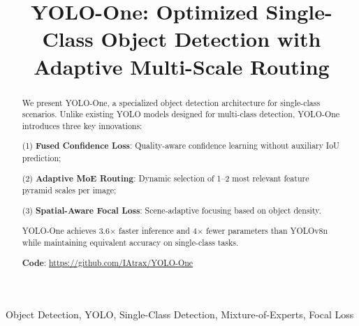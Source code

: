 \documentclass[conference]{IEEEtran}
\begin{document}

\title{YOLO-One: Optimized Single-Class Object Detection with Adaptive Multi-Scale Routing}

\author{
}


\maketitle


\begin{abstract}
We present YOLO-One, a specialized object detection architecture for single-class scenarios. Unlike existing YOLO models designed for multi-class detection, YOLO-One introduces three key innovations:

(1) \textbf{Fused Confidence Loss}: Quality-aware confidence learning without auxiliary IoU prediction;

(2) \textbf{Adaptive MoE Routing}: Dynamic selection of 1--2 most relevant feature pyramid scales per image;

(3) \textbf{Spatial-Aware Focal Loss}: Scene-adaptive focusing based on object density.

YOLO-One achieves 3.6$\times$ faster inference and 4$\times$ fewer parameters than YOLOv8n while maintaining equivalent accuracy on single-class tasks.

\textbf{Code}: \url{https://github.com/IAtrax/YOLO-One}
\end{abstract}


\begin{IEEEkeywords}
Object Detection, YOLO, Single-Class Detection, Mixture-of-Experts, Focal Loss
\end{IEEEkeywords}
\end{document}
